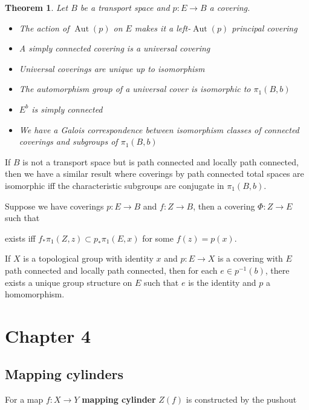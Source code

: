 \documentclass[12pt]{article}
\newtheorem*{thm*}{Theorem}
\DeclareMathOperator{\Aut}{Aut}
\begin{document}
\begin{thm*}
    Let $B$ be a transport space and $p:E\to B$ a covering.
    \begin{itemize}
        \item The action of $\Aut(p)$ on $E$ makes it a left-$\Aut(p)$ principal covering
        \item A simply connected covering is a universal covering
        \item Universal coverings are unique up to isomorphism
        \item The automorphism group of a universal cover is isomorphic to $\pi_1(B,b)$
        \item $E^b$ is simply connected
        \item We have a Galois correspondence between isomorphism classes of connected coverings and subgroups of $\pi_1(B,b)$
    \end{itemize}
\end{thm*}


If $B$ is not a transport space but is path connected and locally path connected, then we have a similar result where coverings by path connected total spaces are isomorphic iff the characteristic subgroups are conjugate in $\pi_1(B,b)$.

Suppose we have coverings $p:E\to B$ and $f:Z\to B$, then a covering $\Phi:Z\to E$ such that  exists iff $f_*\pi_1(Z,z)\subset p_*\pi_1(E,x)$ for some $f(z)=p(x)$.

If $X$ is a topological group with identity $x$ and $p:E\to X$ is a covering with $E$ path connected and locally path connected, then for each $e\in p^{-1}(b)$, there exists a unique group structure on $E$ such that $e$ is the identity and $p$ a homomorphism.



\section{Chapter 4}

\subsection{Mapping cylinders}

For a map $f:X\to Y$ \textbf{mapping cylinder} $Z(f)$ is constructed by the pushout
\end{document}
